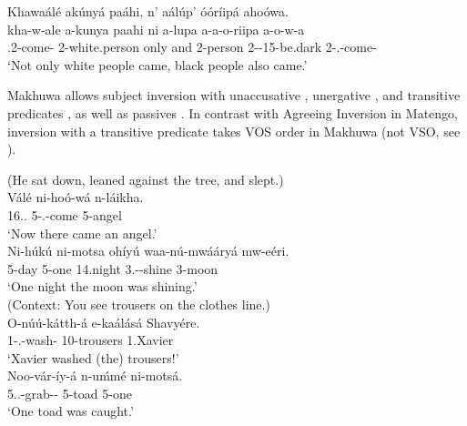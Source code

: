 \documentclass[output=paper]{langscibook}
\begin{document}
\ex
\label{bkm:Ref110329486}
Khawaálé akúnyá paáhi, n’ aálúp’ óóríipá ahoówa.\\
\gll
kha-w-ale  a-kunya  paahi ni  a-lupa  a-a-o-riipa  a-o-w-a\\
\NEG.2\SM{}-come-\PFV{}  2-white.person  only  and  2-person  2-\CONN{}-15-be.dark  2\SM{}-\PFV{}.\DJ{}-{}come-\FV{}\\
\glt
‘Not only white people came, black people also came.’\\

\z

Makhuwa allows subject inversion with unaccusative , unergative , and transitive predicates , as well as passives . In contrast with Agreeing Inversion in Matengo, inversion with a transitive predicate takes VOS order in Makhuwa (not VSO, see \citealt{vanderWal2012a}).

\ea
\label{bkm:Ref95376756}
(He sat down, leaned against the tree, and slept.)\\
\gll
Válé  ni-hoó-wá  n-láikha.\\
16.\DEM{}.\DIST{}  5\SM{}-\PFV{}.\DJ{}-come  5-angel\\
\glt
‘Now there came an angel.’ \citep[189]{vanderWal2009a}\\

\ex
\label{bkm:Ref95376764}
\gll
Ni-húkú  ni-motsa  ohíyú  waa-nú-mwááryá  mw-eéri.\\
5-day  5-one  14.night  3\SM{}.\PST{}-\PERS{}-shine  3-moon\\
\glt
‘One night the moon was shining.’ \citep[189]{vanderWal2009a}\\

\ex
\label{bkm:Ref95376775}
(Context: You see trousers on the clothes line.)\\
\gll
O-núú-kátth-á  e-kaálásá  Shavyére.\\
1\SM{}-\PFV{}.\PERS{}-wash-\FV{}  10-trousers  1.Xavier\\
\glt
‘Xavier washed (the) trousers!’\\

\ex
\label{bkm:Ref95376783}
\ea
\gll
Noo-vár-íy-á  n-uḿmé  ni-motsá.\\
5\SM{}.\PFV{}.\DJ{}-grab-\PASS{}-\FV{}  5-toad  5-one\\
\glt
‘One toad was caught.’ \citep[189]{vanderWal2009a}\\
\end{document}
